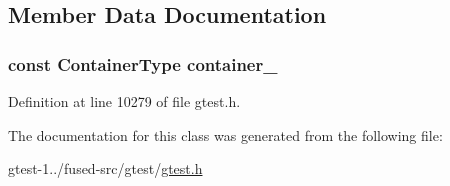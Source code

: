 \subsection{\-Member \-Data \-Documentation}
\hypertarget{classtesting_1_1internal_1_1ValuesInIteratorRangeGenerator_a79ef83271a99d7944d173568b277903f}{
\subsubsection[{container\-\_\-}]{\setlength{\rightskip}{0pt plus 5cm}const {\bf \-Container\-Type} {\bf container\-\_\-}}}\label{d7/d34/classtesting_1_1internal_1_1ValuesInIteratorRangeGenerator_a79ef83271a99d7944d173568b277903f}


\-Definition at line 10279 of file gtest.\-h.



\-The documentation for this class was generated from the following file\-:\begin{DoxyCompactItemize}
\item 
gtest-\/1../fused-\/src/gtest/\hyperlink{fused-src_2gtest_2gtest_8h}{gtest.\-h}\end{DoxyCompactItemize}
